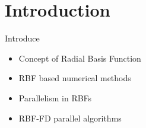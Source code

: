 \chapter{Introduction}

Introduce
\begin{itemize} 
\item Concept of Radial Basis Function
\item RBF based numerical methods
\item Parallelism in RBFs
\item RBF-FD parallel algorithms
\end{itemize} 
